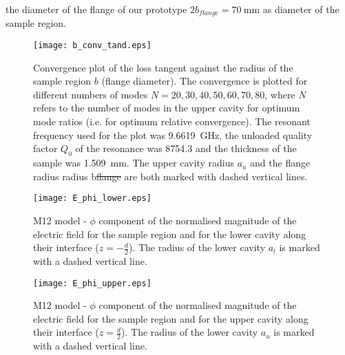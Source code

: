 the diameter of the flange of our prototype $2b_{flange}=\SI{70}{\milli\meter}$ as diameter of the sample region. 

\begin{figure}
\centering
\texttt{[image: b\_conv\_tand.eps]}
\caption{Convergence plot of the loss tangent \tand{} against the radius of the sample region $b$ (flange diameter). The convergence is plotted for different numbers of modes $N=20,30,40,50,60,70,80$, where $N$ refers to the number of modes in the upper cavity for optimum mode ratios (i.e. for optimum relative convergence). The resonant frequency used for the plot was \SI{9.6619}{\giga\hertz}, the unloaded quality factor $Q_0$ of the resonance was \num{8754.3} and the thickness of the sample was \SI{1.509}{\milli\meter}. The upper cavity radius $a_u$ and the flange radius radius b\st{flange} are both marked with dashed vertical lines.}\label{fig:b_tand}
\end{figure}

\begin{figure}
\centering
\texttt{[image: E\_phi\_lower.eps]}
\caption{M12 model - $\phi$ component of the normalised magnitude of the electric field for the sample region and for the lower cavity along their interface ($z=-\frac{d}{2}$). The radius of the lower cavity $a_l$ is marked with a dashed vertical line.}\label{fig:ephil}
\end{figure}
\begin{figure}
\centering
\texttt{[image: E\_phi\_upper.eps]}
\caption{M12 model - $\phi$ component of the normalised magnitude of the electric field for the sample region and for the upper cavity along their interface ($z=\frac{d}{2}$). The radius of the lower cavity $a_u$ is marked with a dashed vertical line.}\label{fig:ephiu}
\end{figure}

